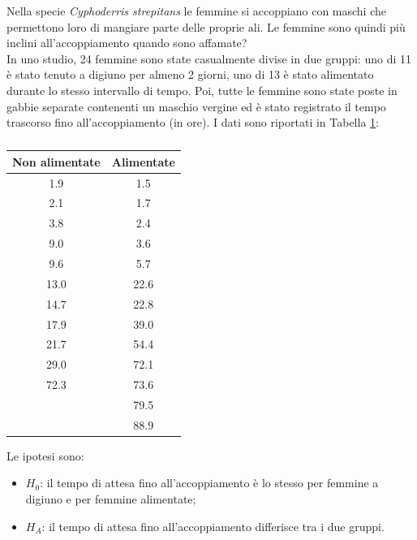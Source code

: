 \documentclass[10pt, draft]{book}
\newcommand{\tightlist}{%
\setlength{\itemsep}{1pt}\setlength{\parskip}{0pt}\setlength{\parsep}{0pt}}
\newcounter{example}[section]
\begin{document}
\begin{example}\label{esgrilli}
    Nella specie \textit{Cyphoderris strepitans} le femmine si accoppiano con maschi che permettono loro di mangiare parte delle proprie ali. Le femmine sono quindi più inclini all'accoppiamento quando sono affamate?\\
    In uno studio, 24 femmine sono state casualmente divise in due gruppi: uno di 11 è stato tenuto a digiuno per almeno 2 giorni, uno di 13 è stato alimentato durante lo stesso intervallo di tempo. Poi, tutte le femmine sono state poste in gabbie separate contenenti un maschio vergine ed è stato registrato il tempo trascorso fino all'accoppiamento (in ore). I dati sono riportati in Tabella \ref{tabgrilli}:
    \begin{table}[H]
        \centering
        \renewcommand\arraystretch{1.2}
        \begin{tabular}{c|c}
        \textbf{Non alimentate} & \textbf{Alimentate}\\ 
        \hline
        1.9 & 1.5\\
        \hline
        2.1 & 1.7\\
        \hline
        3.8 & 2.4\\
        \hline
        9.0 & 3.6\\
        \hline
        9.6 & 5.7\\
        \hline
        13.0 & 22.6\\
        \hline
        14.7 & 22.8\\
        \hline
        17.9 & 39.0\\
        \hline
        21.7 & 54.4\\
        \hline
        29.0 & 72.1\\
        \hline
        72.3 & 73.6\\
        \hline
         & 79.5\\
        \hline
         & 88.9\\
        \hline
        \end{tabular}
        \caption{\small{}}
        \label{tabgrilli}
    \end{table}\noindent
    Le ipotesi sono:
    \begin{itemize}\tightlist
        \item $H_0$: il tempo di attesa fino all'accoppiamento è lo stesso per femmine a digiuno e per femmine alimentate;
        \item $H_A$: il tempo di attesa fino all'accoppiamento differisce tra i due gruppi.

\end{itemize}
\end{example}
\end{document}
